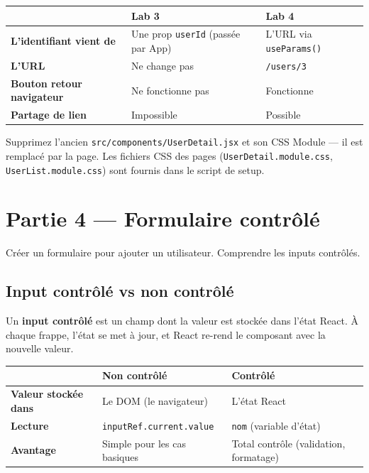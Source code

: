 \documentclass[11pt,a4paper]{article}
\begin{document}
\begin{retenirbox}
\begin{center}
\begin{tabular}{lp{4.5cm}p{4.5cm}}
\toprule
& \textbf{Lab 3} & \textbf{Lab 4} \\
\midrule
\textbf{L'identifiant vient de} & Une prop \texttt{userId} (passée par App) & L'URL via \texttt{useParams()} \\
\textbf{L'URL} & Ne change pas & \texttt{/users/3} \\
\textbf{Bouton retour navigateur} & Ne fonctionne pas & Fonctionne \\
\textbf{Partage de lien} & Impossible & Possible \\
\bottomrule
\end{tabular}
\end{center}
\end{retenirbox}

Supprimez l'ancien \texttt{src/components/UserDetail.jsx} et son CSS Module --- il est remplacé par la page. Les fichiers CSS des pages (\texttt{UserDetail.module.css}, \texttt{UserList.module.css}) sont fournis dans le script de setup.

\section{Partie 4 --- Formulaire contrôlé}
\label{sec:formulaire}

\begin{objectifbox}
Créer un formulaire pour ajouter un utilisateur. Comprendre les inputs contrôlés.
\end{objectifbox}

\subsection{Input contrôlé vs non contrôlé}

Un \textbf{input contrôlé} est un champ dont la valeur est stockée dans l'état React. À chaque frappe, l'état se met à jour, et React re-rend le composant avec la nouvelle valeur.

\begin{center}
\begin{tabular}{lp{5cm}p{5cm}}
\toprule
& \textbf{Non contrôlé} & \textbf{Contrôlé} \\
\midrule
\textbf{Valeur stockée dans} & Le DOM (le navigateur) & L'état React \\
\textbf{Lecture} & \texttt{inputRef.current.value} & \texttt{nom} (variable d'état) \\
\textbf{Avantage} & Simple pour les cas basiques & Total contrôle (validation, formatage) \\
\bottomrule
\end{tabular}
\end{center}
\end{document}
